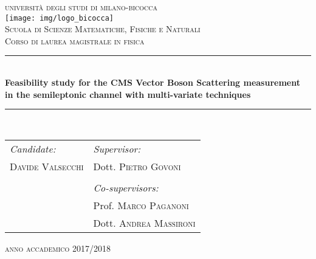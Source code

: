 \documentclass[a4]{article}
\begin{document}
\begin{titlepage}

\newcommand{\HRule}{\rule{\linewidth}{0.5mm}} %

\center %
 
{ 
\textsc{\LARGE università degli studi di milano-bicocca}\\[1cm] %
}
\texttt{[image: img/logo\_bicocca]}\\[1cm] %
\textsc{\Large Scuola di Scienze Matematiche, Fisiche e Naturali }\\[0.25cm] %
\textsc{\large Corso di laurea magistrale in fisica}\\[0.75cm] %


\HRule \\[0.4cm]
{ 
{\huge \bfseries Feasibility study for the CMS Vector Boson Scattering measurement in the semileptonic channel with multi-variate techniques }\\[0.4cm] %
}
\HRule \\[1.5cm]
 
\begin{table}[htb!]
\centering
\begin{tabularx}{\textwidth}{X X}
\emph{Candidate:} & \emph{Supervisor:} \\
\textsc{Davide Valsecchi} & Dott. \textsc{ Pietro Govoni}  \\
& \\
& \emph{Co-supervisors:} \\
& Prof. \textsc{Marco Paganoni} \\
& Dott. \textsc{Andrea Massironi}
\end{tabularx}
\end{table}

\vfill
{
{\large \textsc{anno accademico 2017/2018}}\\[2cm] %
}

\vfill %

\end{titlepage}
 
\end{document}
